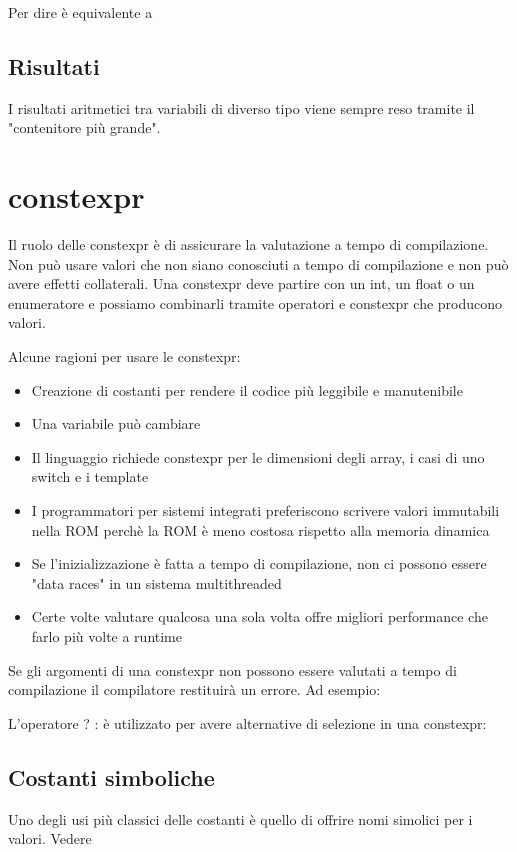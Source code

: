 \documentclass[11pt,a4paper]{book}
\begin{document}
Per dire
\label{code: 148}
è equivalente a
\label{code: 149}

\subsection{Risultati}
I risultati aritmetici tra variabili di diverso tipo viene sempre reso tramite il "contenitore più grande".

\section{constexpr}
Il ruolo delle constexpr è di assicurare la valutazione a tempo di compilazione. Non può usare valori che non siano conosciuti a tempo di compilazione e non può avere effetti collaterali. Una constexpr deve partire con un int, un float o un enumeratore e possiamo combinarli tramite operatori e constexpr che producono valori.

Alcune ragioni per usare le constexpr:
\begin{itemize}
	\item Creazione di costanti per rendere il codice più leggibile e manutenibile
	\item Una variabile può cambiare
	\item Il linguaggio richiede constexpr per le dimensioni degli array, i casi di uno switch e i template
	\item I programmatori per sistemi integrati  preferiscono scrivere valori immutabili nella ROM perchè la ROM è meno costosa rispetto alla memoria dinamica
	\item Se l'inizializzazione è fatta a tempo di compilazione, non ci possono essere "data races" in un sistema multithreaded
	\item Certe volte valutare qualcosa una sola volta offre migliori performance che farlo più volte a runtime
\end{itemize}

Se gli argomenti di una constexpr non possono essere valutati a tempo di compilazione il compilatore restituirà un errore. Ad esempio:
\label{code: 150}

L'operatore ? : è utilizzato per avere alternative di selezione in una constexpr:
\label{code: 151}

\subsection{Costanti simboliche}
Uno degli usi più classici delle costanti è quello di offrire nomi simolici per i valori. Vedere \pageref{par: define e const}
\end{document}
